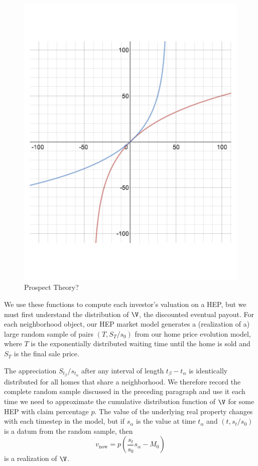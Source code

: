 \documentclass[twoside]{article}
\begin{document}
\begin{figure}[H]
\caption{Prospect Theory?}
\centering
\includegraphics[scale=.39]{FlipFlop.pdf}
\end{figure}

We use these functions to compute each investor's valuation on a HEP, but we must first understand the distribution of $\V$, the discounted eventual payout. For each neighborhood object, our HEP market model generates a (realization of a) large random sample of pairs $(T,S_T/s_0)$ from our home price evolution model, where $T$ is the exponentially distributed waiting time until the home is sold and $S_T$ is the final sale price.

The appreciation $S_{t_\beta}/s_{t_\alpha}$ after any interval of length $t_\beta-t_\alpha$ is identically distributed for all homes that share a neighborhood. We therefore record the complete random sample discussed in the preceding paragraph and use it each time we need to approximate the cumulative distribution function of $\V$ for some HEP with claim percentage $p$. The value of the underlying real property changes with each timestep in the model, but if $s_{\alpha}$ is the value at time $t_\alpha$ and $(t,s_t/s_0)$ is a datum from the random sample, then 
$$
v_\mathrm{now} = p\left(\frac{s_t}{s_0}s_{\alpha}-M_0\right)
$$
is a realization of $\V$.
\end{document}
